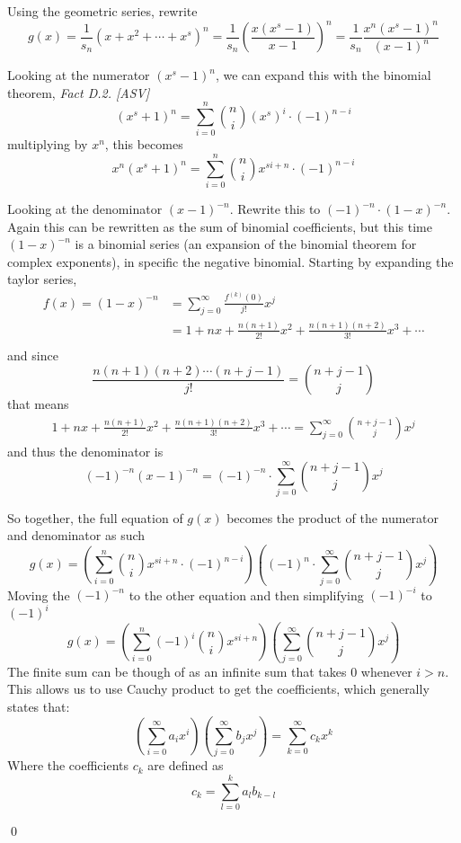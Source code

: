 \documentclass[a4paper]{article}
\renewenvironment{proof}{{\bfseries Proof}}{\qed}
\begin{document}
\begin{proof}
    Using the geometric series, rewrite
    $$
    g(x) = \frac{1}{s_n}(x + x^2 + \cdots + x^s)^n = \frac{1}{s_n} \left(\frac{x(x^s-1)}{x-1} \right)^n = \frac{1}{s_n} \frac{x^n(x^s-1)^n}{(x-1)^n}
    $$

    Looking at the numerator $(x^s - 1)^n$, we can expand this with the binomial theorem, \textit{Fact D.2. [ASV]}
    $$
    (x^s+1)^n = \sum_{i = 0}^{n} \binom{n}{i} (x^s)^i \cdot (-1)^{n-i}
    $$
    multiplying by $x^n$, this becomes
    $$
    x^n(x^s+1)^n = \sum_{i = 0}^{n} \binom{n}{i} x^{si+n} \cdot (-1)^{n-i}
    $$ 

    Looking at the denominator $(x-1)^{-n}$. Rewrite this to $(-1)^{-n} \cdot (1-x)^{-n}$. Again this can be rewritten as the sum of binomial coefficients, but this time $(1-x)^{-n}$ is a binomial series (an expansion of the binomial theorem for complex exponents), in specific the negative binomial. Starting by expanding the taylor series,
    \begin{align*}
        f(x) = (1-x)^{-n} &= \sum_{j = 0}^{\infty} \frac{f^{(k)}(0)}{j!} x^j \\
        &=1 + nx + \frac{n(n+1)}{2!} x^2 + \frac{n(n+1)(n+2)}{3!} x^3 + \cdots \\
    \end{align*}  
    and since 
    $$
    \frac{n(n+1)(n+2) \cdots (n+j-1)}{j!} = \binom{n+j-1}{j}
    $$
    that means
    \begin{align*}
        1 + nx + \frac{n(n+1)}{2!} x^2 + \frac{n(n+1)(n+2)}{3!} x^3 + \cdots = \sum_{j = 0}^{\infty}\binom{n+j-1}{j} x^j
    \end{align*}
    and thus the denominator is 
    $$ 
    (-1)^{-n} (x-1)^{-n} = (-1)^{-n} \cdot\sum_{j = 0}^{\infty}\binom{n+j-1}{j} x^j 
    $$

    So together, the full equation of $g(x)$ becomes the product of the numerator and denominator as such  
    $$
    g(x) = \left(\sum_{i = 0}^{n} \binom{n}{i} x^{si+n} \cdot (-1)^{n-i} \right) \left((-1)^n \cdot \sum_{j = 0}^{\infty}\binom{n+j-1}{j} x^j \right)
    $$ 
    Moving the $(-1)^{-n}$ to the other equation and then simplifying $(-1)^{-i}$ to $(-1)^i$  
    $$
    g(x) = \left(\sum_{i = 0}^{n} (-1)^i \binom{n}{i} x^{si+n} \right) \left(\sum_{j = 0}^{\infty}\binom{n+j-1}{j} x^j \right)
    $$ 
    The finite sum can be though of as an infinite sum that takes $0$ whenever $i > n$. This allows us to use Cauchy product to get the coefficients, which generally states that:
    $$
    \left(\sum_{i=0}^{\infty} a_i x^i \right) \left(\sum_{j=0}^{\infty} b_j x^j \right) = \sum_{k=0}^{\infty} c_k x^k
    $$  
    Where the coefficients $c_k$ are defined as
    $$
    c_k = \sum_{l = 0}^{k} a_l b_{k-l}
    $$


\end{proof}
\end{document}

